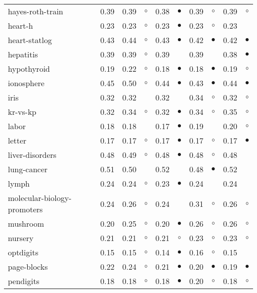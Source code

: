 \begin{table}[htb]
{\begin{tabular}{lrr@{\hspace{0.1cm}}cr@{\hspace{0.1cm}}cr@{\hspace{0.1cm}}cr@{\hspace{0.1cm}}c}
hayes-roth-train & 0.39 & 0.39 &   $\circ$ & 0.38 & $\bullet$ & 0.39 &   $\circ$ & 0.39 &    $\circ$\\
heart-h & 0.23 & 0.23 &   $\circ$ & 0.23 & $\bullet$ & 0.23 &   $\circ$ & 0.23 &           \\
heart-statlog & 0.43 & 0.44 &   $\circ$ & 0.43 & $\bullet$ & 0.42 & $\bullet$ & 0.42 &  $\bullet$\\
hepatitis & 0.39 & 0.39 &   $\circ$ & 0.39 &           & 0.39 &           & 0.38 &  $\bullet$\\
hypothyroid & 0.19 & 0.22 &   $\circ$ & 0.18 & $\bullet$ & 0.18 & $\bullet$ & 0.19 &    $\circ$\\
ionosphere & 0.45 & 0.50 &   $\circ$ & 0.44 & $\bullet$ & 0.43 & $\bullet$ & 0.44 &  $\bullet$\\
iris & 0.32 & 0.32 &           & 0.32 &           & 0.34 &   $\circ$ & 0.32 &    $\circ$\\
kr-vs-kp & 0.32 & 0.34 &   $\circ$ & 0.32 & $\bullet$ & 0.34 &   $\circ$ & 0.35 &    $\circ$\\
labor & 0.18 & 0.18 &           & 0.17 & $\bullet$ & 0.19 &           & 0.20 &    $\circ$\\
letter & 0.17 & 0.17 &   $\circ$ & 0.17 & $\bullet$ & 0.17 &   $\circ$ & 0.17 &  $\bullet$\\
liver-disorders & 0.48 & 0.49 &   $\circ$ & 0.48 & $\bullet$ & 0.48 &   $\circ$ & 0.48 &           \\
lung-cancer & 0.51 & 0.50 &           & 0.52 &           & 0.48 & $\bullet$ & 0.52 &           \\
lymph & 0.24 & 0.24 &   $\circ$ & 0.23 & $\bullet$ & 0.24 &           & 0.24 &           \\
molecular-biology-promoters & 0.24 & 0.26 &   $\circ$ & 0.24 &           & 0.31 &   $\circ$ & 0.26 &    $\circ$\\
mushroom & 0.20 & 0.25 &   $\circ$ & 0.20 & $\bullet$ & 0.26 &   $\circ$ & 0.26 &    $\circ$\\
nursery & 0.21 & 0.21 &   $\circ$ & 0.21 &   $\circ$ & 0.23 &   $\circ$ & 0.23 &    $\circ$\\
optdigits & 0.15 & 0.15 &   $\circ$ & 0.14 & $\bullet$ & 0.16 &   $\circ$ & 0.15 &           \\
page-blocks & 0.22 & 0.24 &   $\circ$ & 0.21 & $\bullet$ & 0.20 & $\bullet$ & 0.19 &  $\bullet$\\
pendigits & 0.18 & 0.18 &   $\circ$ & 0.18 & $\bullet$ & 0.20 &   $\circ$ & 0.18 &    $\circ$\\

\end{tabular}}
\end{table}

